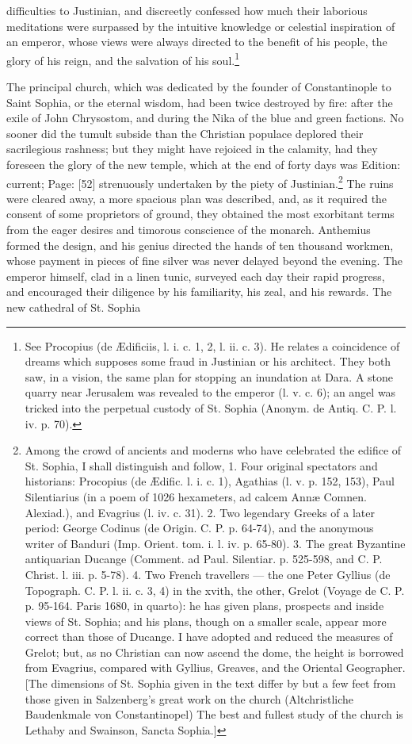 difficulties to Justinian, and discreetly confessed how much their laborious meditations were surpassed by the intuitive knowledge or celestial inspiration of an emperor, whose views were always directed to the benefit of his people, the glory of his reign, and the salvation of his soul.\footnote{See Procopius (de Ædificiis, l. i. c. 1, 2, l. ii. c. 3). He relates a coincidence of dreams which supposes some fraud in Justinian or his architect. They both saw, in a vision, the same plan for stopping an inundation at Dara. A stone quarry near Jerusalem was revealed to the emperor (l. v. c. 6); an angel was tricked into the perpetual custody of St. Sophia (Anonym. de Antiq. C. P. l. iv. p. 70).}

The principal church, which was dedicated by the founder of Constantinople to Saint Sophia, or the eternal wisdom, had been twice destroyed by fire: after the exile of John Chrysostom, and during the Nika of the blue and green factions. No sooner did the tumult subside than the Christian populace deplored their sacrilegious rashness; but they might have rejoiced in the calamity, had they foreseen the glory of the new temple, which at the end of forty days was Edition: current; Page: [52] strenuously undertaken by the piety of Justinian.\footnote{Among the crowd of ancients and moderns who have celebrated the edifice of St. Sophia, I shall distinguish and follow, 1. Four original spectators and historians: Procopius (de Ædific. l. i. c. 1), Agathias (l. v. p. 152, 153), Paul Silentiarius (in a poem of 1026 hexameters, ad calcem Annæ Comnen. Alexiad.), and Evagrius (l. iv. c. 31). 2. Two legendary Greeks of a later period: George Codinus (de Origin. C. P. p. 64-74), and the anonymous writer of Banduri (Imp. Orient. tom. i. l. iv. p. 65-80). 3. The great Byzantine antiquarian Ducange (Comment. ad Paul. Silentiar. p. 525-598, and C. P. Christ. l. iii. p. 5-78). 4. Two French travellers \texthebrew{—} the one Peter Gyllius (de Topograph. C. P. l. ii. c. 3, 4) in the xvith, the other, Grelot (Voyage de C. P. p. 95-164. Paris 1680, in quarto): he has given plans, prospects and inside views of St. Sophia; and his plans, though on a smaller scale, appear more correct than those of Ducange. I have adopted and reduced the measures of Grelot; but, as no Christian can now ascend the dome, the height is borrowed from Evagrius, compared with Gyllius, Greaves, and the Oriental Geographer. [The dimensions of St. Sophia given in the text differ by but a few feet from those given in Salzenberg\texthebrew{}’s great work on the church (Altchristliche Baudenkmale von Constantinopel) The best and fullest study of the church is Lethaby and Swainson, Sancta Sophia.]} The ruins were cleared away, a more spacious plan was described, and, as it required the consent of some proprietors of ground, they obtained the most exorbitant terms from the eager desires and timorous conscience of the monarch. Anthemius formed the design, and his genius directed the hands of ten thousand workmen, whose payment in pieces of fine silver was never delayed beyond the evening. The emperor himself, clad in a linen tunic, surveyed each day their rapid progress, and encouraged their diligence by his familiarity, his zeal, and his rewards. The new cathedral of St. Sophia 